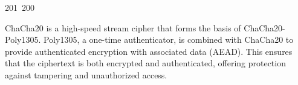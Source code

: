 201~200~\documentclass{article}
\begin{document}
	                                                                                                                                                                                                                                                                                                	                                                                                                                                        	    	                                                                                                	                                                                                                                                                                                                                                                                                                                                	                                                                        	                                                                        	                                                                                                                                        	                                                                                                                                                                                                                        	                                                                                                                            	                                                                	                                                                                        ChaCha20 is a high-speed stream cipher that forms the basis of ChaCha20-Poly1305. Poly1305, a one-time authenticator, is combined with ChaCha20 to provide authenticated encryption with associated data (AEAD). This ensures that the ciphertext is both encrypted and authenticated, offering protection against tampering and unauthorized access.
\end{document}
